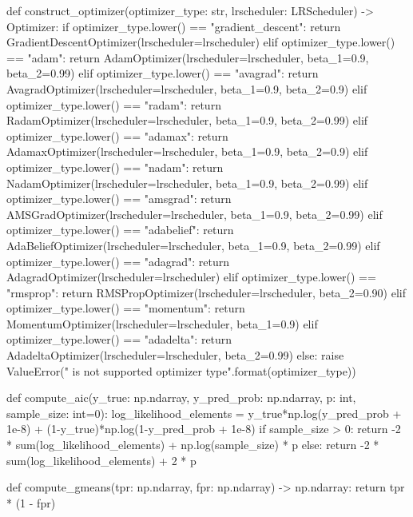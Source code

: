 \documentclass[14pt, a4paper]{article}
\theoremstyle{sltheorem}
\theoremstyle{soltheorem}
\begin{document}
\begin{python}
    
def construct_optimizer(optimizer_type: str, lrscheduler: LRScheduler) -> Optimizer:
    if optimizer_type.lower() == "gradient_descent":
        return GradientDescentOptimizer(lrscheduler=lrscheduler)
    elif optimizer_type.lower() == "adam":
        return AdamOptimizer(lrscheduler=lrscheduler, beta_1=0.9, beta_2=0.99)
    elif optimizer_type.lower() == "avagrad":
        return AvagradOptimizer(lrscheduler=lrscheduler, beta_1=0.9, beta_2=0.9)
    elif optimizer_type.lower() == "radam":
        return RadamOptimizer(lrscheduler=lrscheduler, beta_1=0.9, beta_2=0.99)
    elif optimizer_type.lower() == "adamax":
        return AdamaxOptimizer(lrscheduler=lrscheduler, beta_1=0.9, beta_2=0.9)
    elif optimizer_type.lower() == "nadam":
        return NadamOptimizer(lrscheduler=lrscheduler, beta_1=0.9, beta_2=0.99)
    elif optimizer_type.lower() == "amsgrad":
        return AMSGradOptimizer(lrscheduler=lrscheduler, beta_1=0.9, beta_2=0.99)
    elif optimizer_type.lower() == "adabelief":
        return AdaBeliefOptimizer(lrscheduler=lrscheduler, beta_1=0.9, beta_2=0.99)
    elif optimizer_type.lower() == "adagrad":
        return AdagradOptimizer(lrscheduler=lrscheduler)
    elif optimizer_type.lower() == "rmsprop":
        return RMSPropOptimizer(lrscheduler=lrscheduler, beta_2=0.90)
    elif optimizer_type.lower() == "momentum":
        return MomentumOptimizer(lrscheduler=lrscheduler, beta_1=0.9)
    elif optimizer_type.lower() == "adadelta":
        return AdadeltaOptimizer(lrscheduler=lrscheduler, beta_2=0.99)
    else:
        raise ValueError("{} is not supported optimizer type".format(optimizer_type))


def compute_aic(y_true: np.ndarray, y_pred_prob: np.ndarray, p: int, sample_size: int=0):
    log_likelihood_elements = y_true*np.log(y_pred_prob + 1e-8) + (1-y_true)*np.log(1-y_pred_prob + 1e-8)
    if sample_size > 0:
        return -2 * sum(log_likelihood_elements) + np.log(sample_size) * p
    else:
        return -2 * sum(log_likelihood_elements) + 2 * p


def compute_gmeans(tpr: np.ndarray, fpr: np.ndarray) -> np.ndarray:
    return tpr * (1 - fpr)
\end{python}
\end{document}
